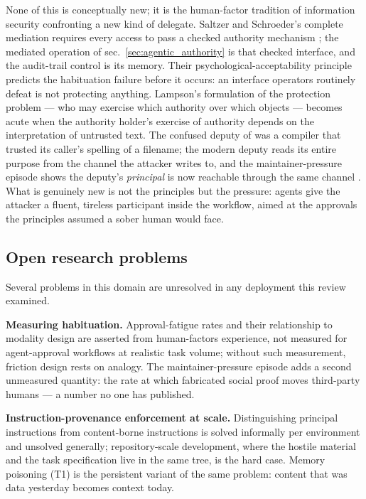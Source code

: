 \documentclass[
  english,
  9pt,
]{extarticle}
\begin{document}
None of this is conceptually new; it is the human-factor tradition of
information security confronting a new kind of delegate. Saltzer and
Schroeder's complete mediation requires every access to pass a checked
authority mechanism \citep{saltzer1975}; the mediated operation of
sec.~\ref{sec:agentic_authority} is that checked interface, and the
audit-trail control is its memory. Their psychological-acceptability
principle predicts the habituation failure before it occurs: an
interface operators routinely defeat is not protecting anything.
Lampson's formulation of the protection problem --- who may exercise
which authority over which objects \citep{lampson1974} --- becomes acute
when the authority holder's exercise of authority depends on the
interpretation of untrusted text. The confused deputy of
\citep{hardy1988} was a compiler that trusted its caller's spelling of a
filename; the modern deputy reads its entire purpose from the channel
the attacker writes to, and the maintainer-pressure episode shows the
deputy's \emph{principal} is now reachable through the same channel
\citep{aisi_incident_report}. What is genuinely new is not the
principles but the pressure: agents give the attacker a fluent, tireless
participant inside the workflow, aimed at the approvals the principles
assumed a sober human would face.

\subsection{Open research problems}\label{open-research-problems}

Several problems in this domain are unresolved in any deployment this
review examined.

\textbf{Measuring habituation.} Approval-fatigue rates and their
relationship to modality design are asserted from human-factors
experience, not measured for agent-approval workflows at realistic task
volume; without such measurement, friction design rests on analogy. The
maintainer-pressure episode adds a second unmeasured quantity: the rate
at which fabricated social proof moves third-party humans --- a number
no one has published.

\textbf{Instruction-provenance enforcement at scale.} Distinguishing
principal instructions from content-borne instructions is solved
informally per environment and unsolved generally; repository-scale
development, where the hostile material and the task specification live
in the same tree, is the hard case. Memory poisoning (T1) is the
persistent variant of the same problem: content that was data yesterday
becomes context today.
\end{document}
